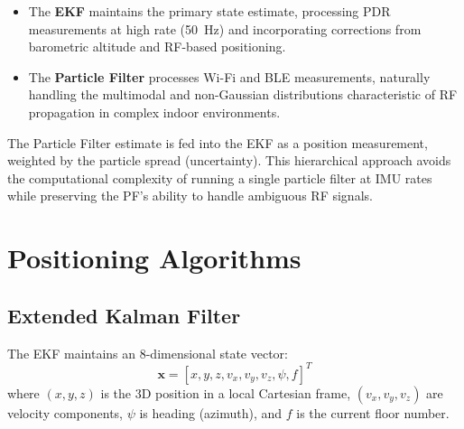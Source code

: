 \documentclass[journal,twocolumn]{IEEEtran}
\begin{document}
\begin{itemize}
    \item The \textbf{EKF} maintains the primary state estimate, processing PDR measurements at high rate (50~Hz) and incorporating corrections from barometric altitude and RF-based positioning.
    \item The \textbf{Particle Filter} processes Wi-Fi and BLE measurements, naturally handling the multimodal and non-Gaussian distributions characteristic of RF propagation in complex indoor environments.
\end{itemize}

The Particle Filter estimate is fed into the EKF as a position measurement, weighted by the particle spread (uncertainty). This hierarchical approach avoids the computational complexity of running a single particle filter at IMU rates while preserving the PF's ability to handle ambiguous RF signals.

\section{Positioning Algorithms}
\label{sec:algorithms}

\subsection{Extended Kalman Filter}

The EKF maintains an 8-dimensional state vector:
\begin{equation}
    \mathbf{x} = [x, y, z, v_x, v_y, v_z, \psi, f]^T
    \label{eq:state}
\end{equation}
where $(x, y, z)$ is the 3D position in a local Cartesian frame, $(v_x, v_y, v_z)$ are velocity components, $\psi$ is heading (azimuth), and $f$ is the current floor number.
\end{document}
